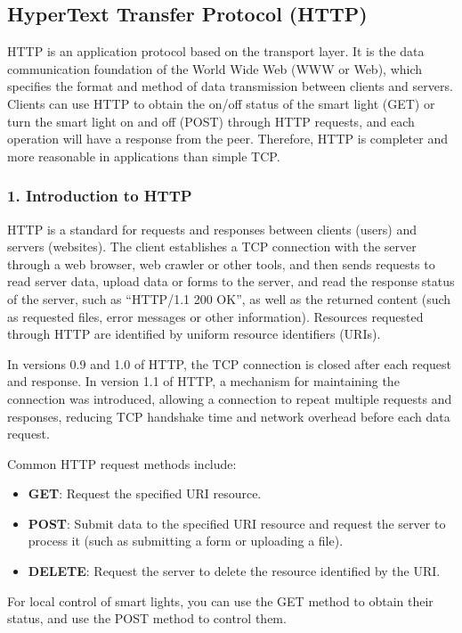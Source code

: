 \documentclass[a4paper,12pt,openany]{book}
\begin{document}
\subsection{HyperText Transfer Protocol (HTTP)}
HTTP is an application protocol based on the transport layer. It is the data communication foundation of the World Wide Web (WWW or Web), which specifies the format and method of data transmission between clients and servers. Clients can use HTTP to obtain the on/off status of the smart light (GET) or turn the smart light on and off (POST) through HTTP requests, and each operation will have a response from the peer. Therefore, HTTP is completer and more reasonable in applications than simple TCP.

\subsubsection{1. Introduction to HTTP}
HTTP is a standard for requests and responses between clients (users) and servers (websites). The client establishes a TCP connection with the server through a web browser, web crawler or other tools, and then sends requests to read server data, upload data or forms to the server, and read the response status of the server, such as “HTTP/1.1 200 OK”, as well as the returned content (such as requested files, error messages or other information). Resources requested through HTTP are identified by uniform resource identifiers (URIs).

In versions 0.9 and 1.0 of HTTP, the TCP connection is closed after each request and response. In version 1.1 of HTTP, a mechanism for maintaining the connection was introduced, allowing a connection to repeat multiple requests and responses, reducing TCP handshake time and network overhead before each data request.

Common HTTP request methods include:

\begin{itemize}[noitemsep]
    \item \textbf{GET}: Request the specified URI resource.
    \item \textbf{POST}: Submit data to the specified URI resource and request the server to process it (such as submitting a form or uploading a file).
    \item \textbf{DELETE}: Request the server to delete the resource identified by the URI.
\end{itemize}

For local control of smart lights, you can use the GET method to obtain their status, and use the POST method to control them.
\end{document}
